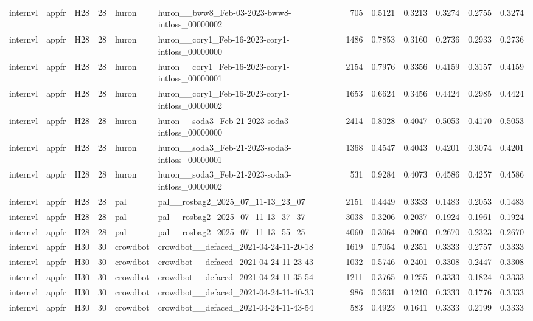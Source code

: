 \begin{table}[tbp]
\begin{tabular}{lllrllrrrrrr}
internvl & appfr & H28 & 28 & huron & huron\_\_bww8\_Feb-03-2023-bww8-intloss\_00000002 & 705 & 0.5121 & 0.3213 & 0.3274 & 0.2755 & 0.3274 \\
internvl & appfr & H28 & 28 & huron & huron\_\_cory1\_Feb-16-2023-cory1-intloss\_00000000 & 1486 & 0.7853 & 0.3160 & 0.2736 & 0.2933 & 0.2736 \\
internvl & appfr & H28 & 28 & huron & huron\_\_cory1\_Feb-16-2023-cory1-intloss\_00000001 & 2154 & 0.7976 & 0.3356 & 0.4159 & 0.3157 & 0.4159 \\
internvl & appfr & H28 & 28 & huron & huron\_\_cory1\_Feb-16-2023-cory1-intloss\_00000002 & 1653 & 0.6624 & 0.3456 & 0.4424 & 0.2985 & 0.4424 \\
internvl & appfr & H28 & 28 & huron & huron\_\_soda3\_Feb-21-2023-soda3-intloss\_00000000 & 2414 & 0.8028 & 0.4047 & 0.5053 & 0.4170 & 0.5053 \\
internvl & appfr & H28 & 28 & huron & huron\_\_soda3\_Feb-21-2023-soda3-intloss\_00000001 & 1368 & 0.4547 & 0.4043 & 0.4201 & 0.3074 & 0.4201 \\
internvl & appfr & H28 & 28 & huron & huron\_\_soda3\_Feb-21-2023-soda3-intloss\_00000002 & 531 & 0.9284 & 0.4073 & 0.4586 & 0.4257 & 0.4586 \\
internvl & appfr & H28 & 28 & pal & pal\_\_rosbag2\_2025\_07\_11-13\_23\_07 & 2151 & 0.4449 & 0.3333 & 0.1483 & 0.2053 & 0.1483 \\
internvl & appfr & H28 & 28 & pal & pal\_\_rosbag2\_2025\_07\_11-13\_37\_37 & 3038 & 0.3206 & 0.2037 & 0.1924 & 0.1961 & 0.1924 \\
internvl & appfr & H28 & 28 & pal & pal\_\_rosbag2\_2025\_07\_11-13\_55\_25 & 4060 & 0.3064 & 0.2060 & 0.2670 & 0.2323 & 0.2670 \\
internvl & appfr & H30 & 30 & crowdbot & crowdbot\_\_defaced\_2021-04-24-11-20-18 & 1619 & 0.7054 & 0.2351 & 0.3333 & 0.2757 & 0.3333 \\
internvl & appfr & H30 & 30 & crowdbot & crowdbot\_\_defaced\_2021-04-24-11-23-43 & 1032 & 0.5746 & 0.2401 & 0.3308 & 0.2447 & 0.3308 \\
internvl & appfr & H30 & 30 & crowdbot & crowdbot\_\_defaced\_2021-04-24-11-35-54 & 1211 & 0.3765 & 0.1255 & 0.3333 & 0.1824 & 0.3333 \\
internvl & appfr & H30 & 30 & crowdbot & crowdbot\_\_defaced\_2021-04-24-11-40-33 & 986 & 0.3631 & 0.1210 & 0.3333 & 0.1776 & 0.3333 \\
internvl & appfr & H30 & 30 & crowdbot & crowdbot\_\_defaced\_2021-04-24-11-43-54 & 583 & 0.4923 & 0.1641 & 0.3333 & 0.2199 & 0.3333 \\

\end{tabular}
\end{table}
